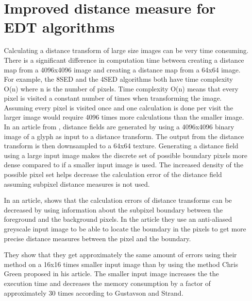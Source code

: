 \section{Improved distance measure for EDT algorithms}\label{limitEDT}
Calculating a distance transform of large size images can be very time consuming. There is a significant difference in computation time between creating a distance map from a 4096x4096 image and creating a distance map from a 64x64 image. For example, the 8SED and the 4SED algorithms both have time complexity O(n) where n is the number of pixels. Time complexity O(n) means that every pixel is visited a constant number of times when transforming the image. Assuming every pixel is visited once and one calculation is done per visit the larger image would require 4096 times more calculations than the smaller image. In an article from \citet{Green:2007}, distance fields are generated by using a 4096x4096 binary image of a glyph as input to a distance transform. The output from the distance transform is then downsampled to a 64x64 texture. Generating a distance field using a large input image makes the discrete set of possible boundary pixels more dense compared to if a smaller input image is used. The increased density of the possible pixel set helps decrease the calculation error of the distance field assuming subpixel distance measures is not used.

In an article, \citet{Gustavson:2011} shows that the calculation errors of distance transforms can be decreased by using information about the subpixel boundary between the foreground and the background pixels. In the article they use an anti-aliased greyscale input image to be able to locate the boundary in the pixels to get more precise distance measures between the pixel and the boundary. 

 They show that they get approximately the same amount of errors using their method on a 16x16 times smaller input image than by using the method Chris Green proposed in his article. The smaller input image increases the the execution time and decreases the memory consumption by a factor of approximately 30 times according to Gustavson and Strand.
